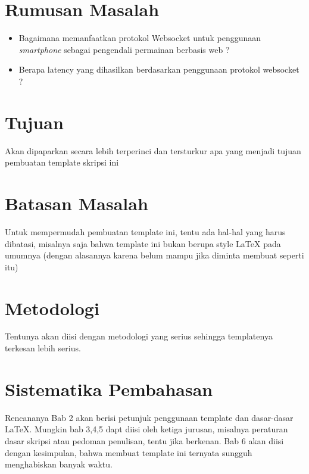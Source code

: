 
\section{Rumusan Masalah}
\label{sec:rumusan}
\begin{itemize}
	\item Bagaimana memanfaatkan protokol Websocket untuk penggunaan \textit{smartphone} sebagai pengendali permainan berbasis web ?
	\item Berapa latency yang dihasilkan berdasarkan penggunaan protokol websocket ? 
\end{itemize}


\section{Tujuan}
\label{sec:tujuan}
Akan dipaparkan secara lebih terperinci dan tersturkur apa yang menjadi tujuan pembuatan template skripsi ini


\section{Batasan Masalah}
\label{sec:batasan}
Untuk mempermudah pembuatan template ini, tentu ada hal-hal yang harus dibatasi, misalnya saja bahwa template ini bukan berupa style \LaTeX{} pada umumnya (dengan alasannya karena belum mampu jika diminta membuat seperti itu)


\section{Metodologi}
\label{sec:metlit}
Tentunya akan diisi dengan metodologi yang serius sehingga templatenya terkesan lebih serius.


\section{Sistematika Pembahasan}
\label{sec:sispem}
Rencananya Bab 2 akan berisi petunjuk penggunaan template dan dasar-dasar \LaTeX.
Mungkin bab 3,4,5 dapt diisi oleh ketiga jurusan, misalnya peraturan dasar skripsi atau pedoman penulisan, tentu jika berkenan.
Bab 6 akan diisi dengan kesimpulan, bahwa membuat template ini ternyata sungguh menghabiskan banyak waktu.

